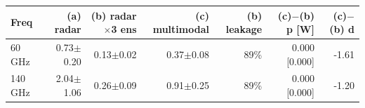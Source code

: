 \begin{tabular}{lrrrrrr}
\toprule
Freq & (a) radar & (b) radar$\times$3 ens & (c) multimodal & (b) leakage & (c)$-$(b) p [W] & (c)$-$(b) d \\
\midrule
60 GHz & 0.73$\pm$0.20 & 0.13$\pm$0.02 & 0.37$\pm$0.08 & 89\% & 0.000 [0.000] & -1.61 \\
140 GHz & 2.04$\pm$1.06 & 0.26$\pm$0.09 & 0.91$\pm$0.25 & 89\% & 0.000 [0.000] & -1.20 \\
\bottomrule
\end{tabular}
